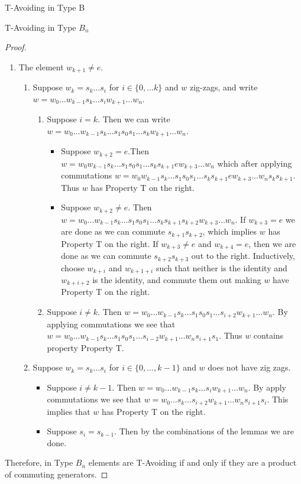 \documentclass[11pt]{amsart}
\theoremstyle{definition}
\numberwithin{equation}{section}
\renewcommand{\(}{\left(}
\renewcommand{\)}{\right)}
\begin{document}
\begin{section}{T-Avoiding in Type B}
\begin{subsection}{T-Avoiding in Type $B_n$}
\begin{proof}
\begin{enumerate}
\begin{enumerate}
\begin{enumerate}
	\end{enumerate}
	\item The element $w_{k+1} \neq e$.
	\begin{enumerate}
	\item Suppose $w_k=s_k \ldots s_i$ for $i \in \{0, \ldots k\}$ and $w$ zig-zags, and write $w=w_0 \ldots w_{k-1} s_k \ldots s_i w_{k+1} \ldots w_n$.
	\begin{enumerate}
	\item Suppose $i=k$. Then we can write $w=w_0 \ldots w_{k-1} s_k \ldots s_1 s_0 s_1 \ldots s_k w_{k+1} \ldots w_n$.
	\begin{itemize}
	\item Suppose $w_{k+2}=e$.Then $w=w_0 w_{k-1} s_k \ldots s_1 s_0 s_1 \ldots s_k s_{k+1} e w_{k+3} \ldots w_n$ which after applying commutations $w=w_0 w_{k-1} s_k \ldots s_1 s_0 s_1 \ldots s_k s_{k+1} e w_{k+3} \ldots w_n s_k s_{k+1}$. Thus $w$ has Property T on the right.
	\item Suppose $w_{k+2} \neq e$. Then $w=w_0 \ldots w_{k-1} s_k \ldots s_1 s_0 s_1 \ldots s_k s_{k+1} s_{k+2} w_{k+3} \ldots w_n$. If $w_{k+3}=e$ we are done as we can commute $s_{k+1}s_{k+2}$, which implies $w$ has Property T on the right. If $w_{k+3} \neq e$ and $w_{k+4} = e$, then we are done as we can commute $s_{k+2} s_{k+3}$ out to the right. Inductively, choose $w_{k+i}$ and $w_{k+1+i}$  such that neither is the identity and $w_{k+i+2}$ is the identity, and commute them out making $w$ have Property T on the right.
	\end{itemize}
	\item Suppose $i \neq k$. Then $w=w_0 \ldots w_{k-1} s_{k} \ldots s_1 s_0 s_1 \ldots s_{i+2} w_{k+1} \ldots w_n$. By applying commutations we see that $w=w_0 \ldots w_{k-1} s_k \ldots s_1 s_0 s_1 \ldots s_{i-2} w_{k+1} \ldots w_n s_{i+1} s_1$. Thus $w$ contains property Property T.
	\end{enumerate}
	\item Suppose $w_k=s_k \ldots s_i$ for $i \in \{0, \ldots, k-1\}$ and $w$ does not have zig zags.
	\begin{itemize}
	\item Suppose $i \neq k-1$. Then $w=w_0 \ldots w_{k-1} s_k \ldots s_i w_{k+1} \ldots w_n$. By apply commutations we see that $w=w_0 \ldots s_k \ldots s_{i+2} w_{k+1} \ldots w_n s_{i+1} s_i$. This implies that $w$ has Property T on the right.
	\item Suppose $s_i =s_{k-1}$. Then by the combinations of the lemmas we are done. 	
	\end{itemize}
	\end{enumerate}
	\end{enumerate}
	\end{enumerate}
	Therefore, in Type $B_n$ elements are T-Avoiding if and only if they are a product of commuting generators.
\end{proof}
\end{subsection}

	
\end{section}




\end{document}
